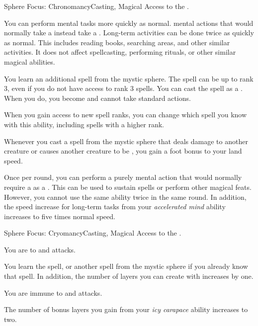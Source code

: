   \begin{magicalfeat}{Sphere Focus: Chronomancy}{Casting, Magical}
    \featpre Access to the  .

     You can perform mental tasks more quickly as normal.
     mental actions that would normally take a  instead take a .
    Long-term activities can be done twice as quickly as normal.
    This includes reading books, searching areas, and other similar activities.
    It does not affect spellcasting, performing rituals, or other similar magical abilities.

     You learn an additional spell from the  mystic sphere.
    The spell can be up to rank 3, even if you do not have access to rank 3 spells.
    You can cast the spell as a .
    When you do, you  become \slowed and cannot take standard actions.

    When you gain access to new spell ranks, you can change which spell you know with this ability, including spells with a higher rank.

     Whenever you cast a spell from the  mystic sphere that deals damage to another creature or causes another creature to be \slowed, you  gain a  foot bonus to your land speed.

     Once per round, you can perform a purely mental action that would normally require a  as a .
    This can be used to sustain spells or perform other magical feats.
    However, you cannot use the same ability twice in the same round.
    In addition, the speed increase for long-term tasks from your \textit{accelerated mind} ability increases to five times normal speed.
  \end{magicalfeat}

  \begin{magicalfeat}{Sphere Focus: Cryomancy}{Casting, Magical}
    \featpre Access to the  .

     You are  to \atCold and \atPoison attacks.

     You learn the  spell, or another spell from the  mystic sphere if you already know that spell.
    In addition, the number of layers you can create with  increases by one.

     You are immune to \atCold and \atPoison attacks.

     The number of bonus layers you gain from your \textit{icy carapace} ability increases to two.
  \end{magicalfeat}

